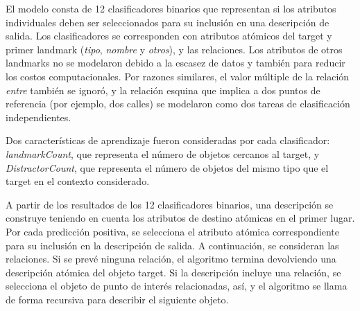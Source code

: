 


El modelo consta de 12 clasificadores binarios que representan si los atributos individuales deben ser seleccionados para su inclusi\'on en una descripci\'on de salida. Los clasificadores se corresponden con atributos at\'omicos del target y primer landmark ({\em tipo}, {\em nombre } y {\em otros}), y las relaciones. Los atributos de otros landmarks no se modelaron debido a la escasez de datos y tambi\'en para reducir los costos computacionales. Por razones similares, el valor m\'ultiple de la relaci\'on {\em entre} tambi\'en se ignor\'o, y la relaci\'on esquina que implica a dos puntos de referencia (por ejemplo, dos calles) se modelaron como dos tareas de clasificaci\'on independientes.

Dos caracter\'{i}sticas de aprendizaje fueron consideradas por cada clasificador: {\em landmarkCount}, que representa el n\'umero de objetos cercanos al target, y {\em DistractorCount}, que representa el n\'umero de objetos del mismo tipo que el target en el contexto considerado.

A partir de los resultados de los 12 clasificadores binarios, una descripci\'on se construye teniendo en cuenta los atributos de destino at\'omicas en el primer lugar. Por cada predicci\'on positiva, se selecciona el atributo at\'omica correspondiente para su inclusi\'on en la descripci\'on de salida. A continuaci\'on, se consideran las relaciones. Si se prev\'e ninguna relaci\'on, el algoritmo termina devolviendo una descripci\'on at\'omica del objeto target. Si la descripci\'on incluye una relaci\'on, se selecciona el objeto de punto de inter\'es relacionadas, as\'{i}, y el algoritmo se llama de forma recursiva para describir el siguiente objeto.

